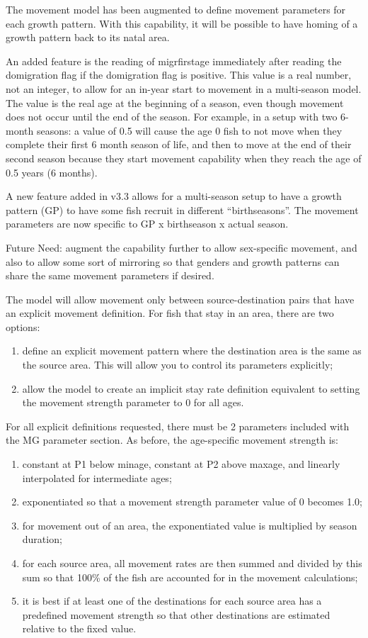 The movement model has been augmented to define movement parameters for each growth pattern.  With this capability, it will be possible to have homing of a growth pattern back to its natal area.

An added feature is the reading of migr\textunderscore firstage immediately after reading the do\textunderscore migration flag if the do\textunderscore migration flag is positive.  This value is a real number, not an integer, to allow for an in-year start to movement in a multi-season model.  The value is the real age at the beginning of a season, even though movement does not occur until the end of the season.  For example, in a  setup with two 6-month seasons:  a value of 0.5 will cause the age 0 fish to not move when they complete their first 6 month season of life, and then to move at the end of their second season because they start movement capability when they reach the age of 0.5 years (6 months).

A new feature added in v3.3 allows for a multi-season setup to have a growth pattern (GP) to have some fish recruit in different “birthseasons”.  The movement parameters are now specific to GP x birthseason x actual season.

Future Need:  augment the capability further to allow sex-specific movement, and also to allow some sort of mirroring so that genders and growth patterns can share the same movement parameters if desired.

The model will allow movement only between source-destination pairs that have an explicit movement definition.  For fish that stay in an area, there are two options:
\begin{enumerate}
	\item define an explicit movement pattern where the destination area is the same as the source area.  This will allow you to control its parameters explicitly;
	\item allow the model to create an implicit stay rate definition equivalent to setting the movement strength parameter to 0 for all ages.
\end{enumerate}

For all explicit definitions requested, there must be 2 parameters included with the MG parameter section.  As before, the age-specific movement strength is:
\begin{enumerate}
	\item constant at P1 below minage, constant at P2 above maxage, and linearly interpolated for intermediate ages;
	\item exponentiated so that a movement strength parameter value of 0 becomes 1.0;
	\item for movement out of an area, the exponentiated value is multiplied by season duration;
	\item for each source area, all movement rates are then summed and divided by this sum so that 100\% of the fish are accounted for in the movement calculations;
	\item it is best if at least one of the destinations for each source area has a predefined movement strength so that other destinations are estimated relative to the fixed value.
\end{enumerate}

